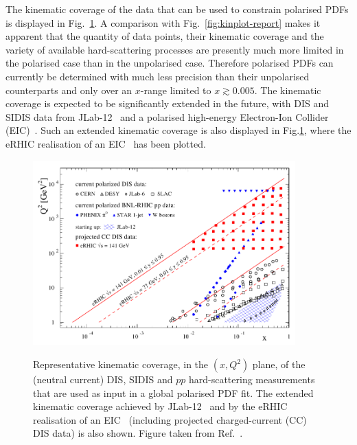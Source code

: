 The kinematic coverage of the data that can be used to constrain polarised 
PDFs is displayed in Fig.~\ref{fig:kinEIC}.
%
A comparison with Fig.~\ref{fig:kinplot-report} makes it apparent that the
quantity of data points, their kinematic coverage and the variety of 
available hard-scattering processes are presently much more limited in the polarised case
than in the unpolarised case.
%
Therefore polarised PDFs can currently be determined with much less 
precision than their unpolarised counterparts and only over an $x$-range limited
to $x\gtrsim 0.005$.
%
The kinematic coverage is expected to be significantly extended in the future,
with DIS and SIDIS data from JLab-12~\cite{Dudek:2012vr} and a polarised 
high-energy Electron-Ion Collider (EIC)~\cite{Accardi:2012qut}.
%
Such an extended kinematic coverage is also displayed in Fig.\ref{fig:kinEIC},
where the eRHIC realisation of an EIC~\cite{Aschenauer:2014cki} has been plotted.

\begin{figure}[!t]
\centering
\includegraphics[width=0.9\textwidth]{plots/kinEIC}\\
\caption{\small Representative kinematic coverage, in the $(x,Q^2)$ plane,
of the (neutral current) DIS, SIDIS and $pp$ hard-scattering measurements 
that are used as input in a global polarised PDF fit.
%
The extended kinematic coverage achieved by 
JLab-12~\cite{Dudek:2012vr} and by the eRHIC~\cite{Aschenauer:2014cki} 
realisation of an EIC~\cite{Accardi:2012qut}
(including projected charged-current (CC) DIS data) is also shown.
%
Figure taken from Ref.~\cite{Aschenauer:2014cki}.}
\label{fig:kinEIC}
\end{figure}

